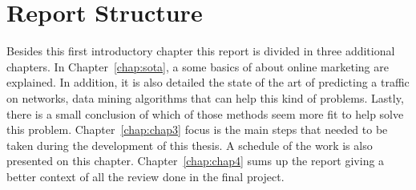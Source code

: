 \section{Report Structure} \label{sec:struct}

Besides this first introductory chapter this report is divided in three additional chapters.
In Chapter~\ref{chap:sota}, a some basics of about online marketing are explained. In addition, it is also detailed the state of the art of
predicting a traffic on networks, data mining algorithms that can help this kind of problems. Lastly, there is
a small conclusion of which of those methods seem more fit to help solve this problem.
Chapter~\ref{chap:chap3} focus is the main steps that needed to be taken during the development of this thesis. A schedule of the work is also
presented on this chapter.
Chapter~\ref{chap:chap4} sums up the report giving a better context of all the review done in the final project.
